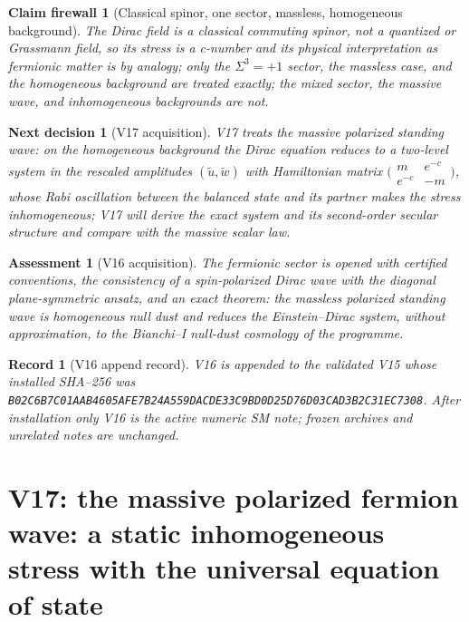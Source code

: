 \documentclass[11pt]{article}
\newtheorem{firewall}[theorem]{Claim firewall}
\newtheorem{decision}[theorem]{Next decision}
\newtheorem{assessment}[theorem]{Assessment}
\newtheorem{record}[theorem]{Record}
\theoremstyle{remark}
\begin{document}
\begin{firewall}[Classical spinor, one sector, massless, homogeneous background]
\label{fire:v20v16}
The Dirac field is a classical commuting spinor, not a quantized or
Grassmann field, so its stress is a c-number and its physical
interpretation as fermionic matter is by analogy; only the
\(\Sigma^3=+1\) sector, the massless case, and the homogeneous
background are treated exactly; the mixed sector, the massive wave,
and inhomogeneous backgrounds are not.
\end{firewall}

\begin{decision}[V17 acquisition]
\label{dec:v20v16-next}
V17 treats the massive polarized standing wave: on the homogeneous
background the Dirac equation reduces to a two-level system in the
rescaled amplitudes \((\tilde u,\tilde w)\) with Hamiltonian matrix
\(\bigl(\begin{smallmatrix}m&e^{-c}\\ e^{-c}&-m\end{smallmatrix}\bigr)\),
whose Rabi oscillation between the balanced state and its partner
makes the stress inhomogeneous; V17 will derive the exact system and
its second-order secular structure and compare with the massive
scalar law.
\end{decision}

\begin{assessment}[V16 acquisition]
\label{ass:v20v16}
The fermionic sector is opened with certified conventions, the
consistency of a spin-polarized Dirac wave with the diagonal
plane-symmetric ansatz, and an exact theorem: the massless polarized
standing wave is homogeneous null dust and reduces the Einstein--Dirac
system, without approximation, to the Bianchi--I null-dust cosmology
of the programme.
\end{assessment}

\begin{record}[V16 append record]
\label{rec:v20v16}
V16 is appended to the validated V15 whose installed SHA--256 was
\texttt{B02C6B7C01AAB4605AFE7B24A559DACDE33C9BD0D25D76D03CAD3B2C31EC7308}.
After installation only V16 is the active numeric SM note; frozen
archives and unrelated notes are unchanged.
\end{record}


\section{V17: the massive polarized fermion wave: a static inhomogeneous stress with the universal equation of state}
\label{sec:v20v17}
\end{document}
